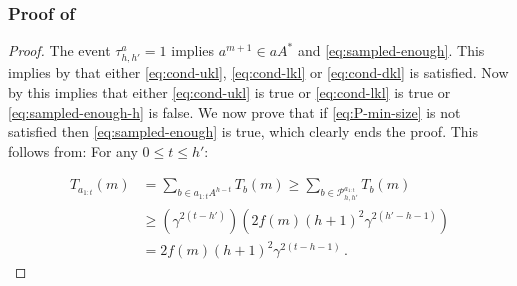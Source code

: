 \subsubsection{Proof of }
\label{sec:proof-size_Ph}
\begin{proof}
	The event $\tau^a_{h,h'}=1$ implies $a^{m+1}\in a A^*$ and \eqref{eq:sampled-enough}. This implies by  that either \eqref{eq:cond-ukl}, \eqref{eq:cond-lkl} or \eqref{eq:cond-dkl} is satisfied. Now by  this implies that either \eqref{eq:cond-ukl} is true or \eqref{eq:cond-lkl} is true or \eqref{eq:sampled-enough-h} is false. We now prove that if \eqref{eq:P-min-size} is not satisfied then \eqref{eq:sampled-enough} is true, which clearly ends the proof.
	This follows from: For any $0 \leq t \leq h'$:
	
	\begin{align*}
	T_{a_{1:t}}(m) &= \sum_{b\in a_{1:t}A^{h-t}} T_b(m) \geq \sum_{b\in \mathcal{P}^{a_{1:t}}_{h,h'}} T_b(m) \\
	&\geq \left(\gamma^{2(t-h')}\right) \left(2f(m)(h+1)^2\gamma^{2(h'-h-1)}\right)\\
	&= 2f(m)(h+1)^2\gamma^{2(t-h-1)}\,.\qquad\qquad
	\end{align*}
\end{proof}

